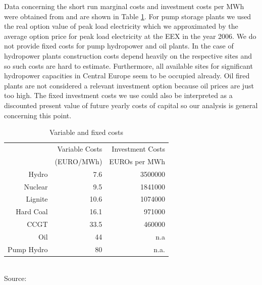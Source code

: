 
Data concerning the short run marginal costs and investment costs per MWh were obtained from \cite[p.46]{Auer2006} and are shown in Table \ref{tab:costs}. For pump storage plants we used the real option value of peak load electricity which we approximated by the average option price for peak load electricity at the EEX in the year 2006. We do not provide fixed costs for pump hydropower and oil plants. In the case of hydropower plants construction costs depend heavily on the respective sites and so such costs are hard to estimate. Furthermore, all available sites for significant hydropower capacities in Central Europe seem to be occupied already. Oil fired plants are not considered a relevant investment option because oil prices are just too high. The fixed investment costs we use could also be interpreted as a discounted present value of future yearly costs of capital so our analysis is general concerning this point.

\begin{table}[htb]
\centering
\caption{Variable and fixed costs}
\vspace{0.3cm}
\begin{tabular}{rrr}
\hline
           & Variable Costs & Investment Costs \\

           & (EURO/MWh) & EUROs per MWh \\
\hline
     Hydro &        7.6 &    3500000 \\

   Nuclear &        9.5 &    1841000 \\

   Lignite &       10.6 &    1074000 \\

 Hard Coal &       16.1 &     971000 \\

CCGT &       33.5 &     460000 \\

Oil & 44            &   n.a \\

Pump Hydro &         80 &       n.a. \\
\hline
\end{tabular}
\label{tab:costs}
\\
\vspace{0.3cm}
\scriptsize Source: \cite{Auer2006}
\end{table}



